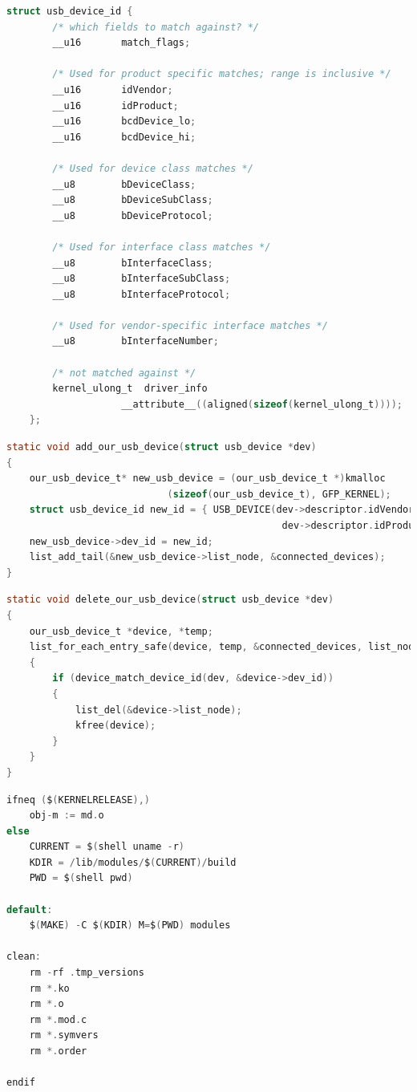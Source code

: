 \documentclass[a4paper, 10pt]{article}
\begin{document}
\begin{lstlisting}[language=C, caption = Структура usb\_device\_id, label =  lst:usb_device_id]
struct usb_device_id {
		/* which fields to match against? */
		__u16		match_flags;
		
		/* Used for product specific matches; range is inclusive */
		__u16		idVendor;
		__u16		idProduct;
		__u16		bcdDevice_lo;
		__u16		bcdDevice_hi;
		
		/* Used for device class matches */
		__u8		bDeviceClass;
		__u8		bDeviceSubClass;
		__u8		bDeviceProtocol;
		
		/* Used for interface class matches */
		__u8		bInterfaceClass;
		__u8		bInterfaceSubClass;
		__u8		bInterfaceProtocol;
		
		/* Used for vendor-specific interface matches */
		__u8		bInterfaceNumber;
		
		/* not matched against */
		kernel_ulong_t	driver_info
					__attribute__((aligned(sizeof(kernel_ulong_t))));
	};
\end{lstlisting}

\begin{lstlisting}[language=C, caption = Добавление usb устройства, label =  lst:add_usb]
static void add_our_usb_device(struct usb_device *dev)
{
	our_usb_device_t* new_usb_device = (our_usb_device_t *)kmalloc
							(sizeof(our_usb_device_t), GFP_KERNEL);
	struct usb_device_id new_id = { USB_DEVICE(dev->descriptor.idVendor, 
												dev->descriptor.idProduct) };
	new_usb_device->dev_id = new_id;
	list_add_tail(&new_usb_device->list_node, &connected_devices);
}
\end{lstlisting}

\begin{lstlisting}[language=C, caption = Удаление usb устройства, label =  lst:del_usb]
static void delete_our_usb_device(struct usb_device *dev)
{
	our_usb_device_t *device, *temp;
	list_for_each_entry_safe(device, temp, &connected_devices, list_node) 
	{
		if (device_match_device_id(dev, &device->dev_id))
		{
			list_del(&device->list_node);
			kfree(device);
		}
	}
}
\end{lstlisting}

\begin{lstlisting}[language=C, caption = Makefile, label =  lst:makefile]
ifneq ($(KERNELRELEASE),)
	obj-m := md.o
else
	CURRENT = $(shell uname -r)
	KDIR = /lib/modules/$(CURRENT)/build
	PWD = $(shell pwd)
	
default:
	$(MAKE) -C $(KDIR) M=$(PWD) modules
	
clean:
	rm -rf .tmp_versions
	rm *.ko
	rm *.o
	rm *.mod.c
	rm *.symvers
	rm *.order
	
endif
\end{lstlisting}
\end{document}
